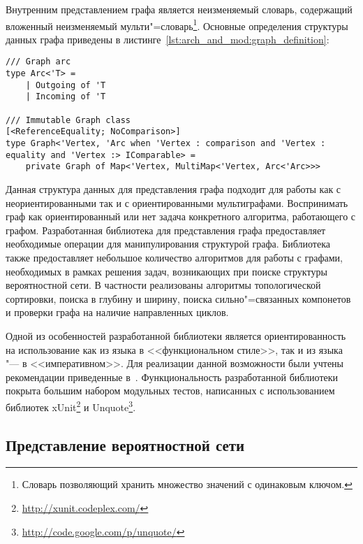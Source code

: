 Внутренним представлением графа является неизменяемый словарь, содержащий вложенный неизменяемый мульти"=словарь\footnote{Словарь позволяющий хранить множество значений с одинаковым ключом.}.
Основные определения структуры данных графа приведены в листинге~\ref{lst:arch_and_mod:graph_definition}:
\begin{lstlisting}[style=fsharpstyle,caption={Определение структуры данных для представления графа}, label=lst:arch_and_mod:graph_definition]
/// Graph arc 
type Arc<'T> =
    | Outgoing of 'T
    | Incoming of 'T

/// Immutable Graph class
[<ReferenceEquality; NoComparison>]
type Graph<'Vertex, 'Arc when 'Vertex : comparison and 'Vertex : equality and 'Vertex :> IComparable> = 
    private Graph of Map<'Vertex, MultiMap<'Vertex, Arc<'Arc>>>
\end{lstlisting}

Данная структура данных для представления графа подходит для работы как с неориентированными так и с ориентированными мультиграфами.
Воспринимать граф как ориентированный или нет задача конкретного алгоритма, работающего с графом.
Разработанная библиотека для представления графа предоставляет необходимые операции для манипулирования структурой графа. 
Библиотека также предоставляет небольшое количество алгоритмов для работы с графами, необходимых в рамках решения задач, возникающих при поиске структуры вероятностной сети.
В частности реализованы алгоритмы топологической сортировки, поиска в глубину и ширину, поиска сильно"=связанных компонетов и проверки графа на наличие направленных циклов. 

Одной из особенностей разработанной библиотеки является ориентированность на использование как из языка \fsharp{} в <<функциональном стиле>>, так и из языка \csharp{} "--- в <<императивном>>.
Для реализации данной возможности были учтены рекомендации приведенные в~\cite{fsdg_2010}.
Функциональность разработанной библиотеки покрыта большим набором модульных тестов, написанных с использованием библиотек xUnit\footnote{\url{http://xunit.codeplex.com/}} и Unquote\footnote{\url{http://code.google.com/p/unquote/}}.


\subsection{Представление вероятностной сети}
\label{sub:arch_and_mod:probab_net}

